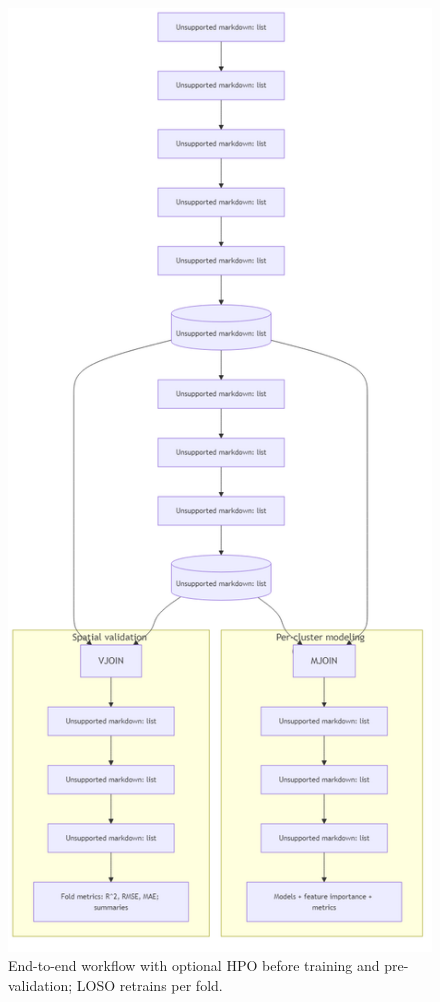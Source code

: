 \documentclass[graybox]{svmult}
\begin{document}
\begin{figure}[p]
  \centering
  \includegraphics[width=\textwidth,height=0.9\textheight,keepaspectratio]{figures/pipeline_flowchart.png}
  \caption{End-to-end workflow with optional HPO before training and pre-validation; LOSO retrains per fold.}
  \label{fig:pipeline}
\end{figure}
\clearpage
\end{document}
